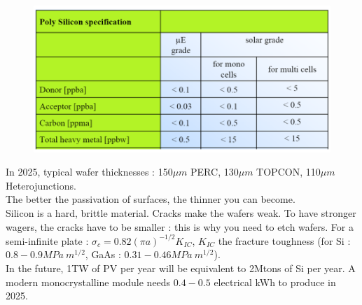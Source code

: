 \documentclass[../main.tex]{subfiles}
\begin{document}
\begin{figure}[hbt!]
    \centering
    \includegraphics[width=0.5\linewidth]{IMAGES/PV/Screenshot from 2025-04-29 13-28-30.png}
\end{figure}
In 2025, typical wafer thicknesses : 150$\mu m$ PERC, 130$\mu m$ TOPCON, 110$\mu m$ Heterojunctions.\\
The better the passivation of surfaces, the thinner you can become. \\
Silicon is a hard, brittle material. Cracks make the wafers weak. To have stronger wagers, the cracks have to be smaller : this is why you need to etch wafers. For a semi-infinite plate : $\sigma_c = 0.82 (\pi a)^{-1/2} K_{IC}$, $K_{IC}$ the fracture toughness (for Si : $0.8-0.9MPa\: m^{1/2}$, GaAs : $0.31-0.46 MPa\: m^{1/2}$).\\

In the future, 1TW of PV per year will be equivalent to 2Mtons of Si per year. A modern monocrystalline module needs $0.4-0.5$ electrical kWh to produce in 2025.
\end{document}
